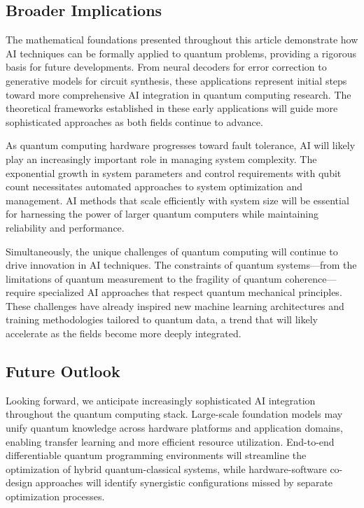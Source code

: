 \subsection{Broader Implications}

The mathematical foundations presented throughout this article demonstrate how AI techniques can be formally applied to quantum problems, providing a rigorous basis for future developments. From neural decoders for error correction to generative models for circuit synthesis, these applications represent initial steps toward more comprehensive AI integration in quantum computing research. The theoretical frameworks established in these early applications will guide more sophisticated approaches as both fields continue to advance.

As quantum computing hardware progresses toward fault tolerance, AI will likely play an increasingly important role in managing system complexity. The exponential growth in system parameters and control requirements with qubit count necessitates automated approaches to system optimization and management. AI methods that scale efficiently with system size will be essential for harnessing the power of larger quantum computers while maintaining reliability and performance.

Simultaneously, the unique challenges of quantum computing will continue to drive innovation in AI techniques. The constraints of quantum systems—from the limitations of quantum measurement to the fragility of quantum coherence—require specialized AI approaches that respect quantum mechanical principles. These challenges have already inspired new machine learning architectures and training methodologies tailored to quantum data, a trend that will likely accelerate as the fields become more deeply integrated.

\subsection{Future Outlook}

Looking forward, we anticipate increasingly sophisticated AI integration throughout the quantum computing stack. Large-scale foundation models may unify quantum knowledge across hardware platforms and application domains, enabling transfer learning and more efficient resource utilization. End-to-end differentiable quantum programming environments will streamline the optimization of hybrid quantum-classical systems, while hardware-software co-design approaches will identify synergistic configurations missed by separate optimization processes.

